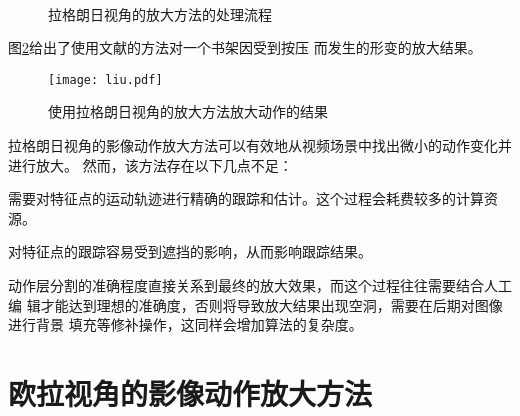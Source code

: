\begin{figure}[htbp]
  \centering
  \qquad
  \qquad
  \\
  \qquad
  \qquad
  \caption{拉格朗日视角的放大方法的处理流程}
  \label{fig:lag}
\end{figure}

图\ref{fig:liu}给出了使用文献\cite{liu2005motion}的方法对一个书架因受到按压
而发生的形变的放大结果。

\clearpage

\begin{figure}[htbp]
  \centering
  \texttt{[image: liu.pdf]}
  \caption{使用拉格朗日视角的放大方法放大动作的结果}
  \label{fig:liu}
\end{figure}

拉格朗日视角的影像动作放大方法可以有效地从视频场景中找出微小的动作变化并进行放大。
然而，该方法存在以下几点不足：

\begin{compactenum}
\item 需要对特征点的运动轨迹进行精确的跟踪和估计。这个过程会耗费较多的计算资源。
\item 对特征点的跟踪容易受到遮挡的影响，从而影响跟踪结果。
\item 动作层分割的准确程度直接关系到最终的放大效果，而这个过程往往需要结合人工编
  辑才能达到理想的准确度，否则将导致放大结果出现空洞，需要在后期对图像进行背景
  填充等修补操作，这同样会增加算法的复杂度。
\end{compactenum}

\section{欧拉视角的影像动作放大方法}
\label{sec:eulerian}

